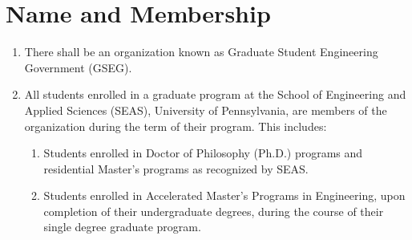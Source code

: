 \chapter{Name and Membership}

\begin{enumerate}[label=\Alph*.]
	\item There shall be an organization known as Graduate Student
	Engineering Government (GSEG).

	\item All students enrolled in a graduate program at the School
	of Engineering and Applied Sciences (SEAS), University of
	Pennsylvania, are members of the organization during the term of
	their program. This includes: 

	\begin{enumerate}[label=(\roman*)]
		\item Students enrolled in Doctor of Philosophy
		(Ph.D.) programs and residential Master's programs as recognized by SEAS.
		\item Students enrolled in Accelerated Master's Programs in
		Engineering, upon completion of their undergraduate degrees,
		during the course of their single degree graduate program.
	\end{enumerate}
\end{enumerate}
